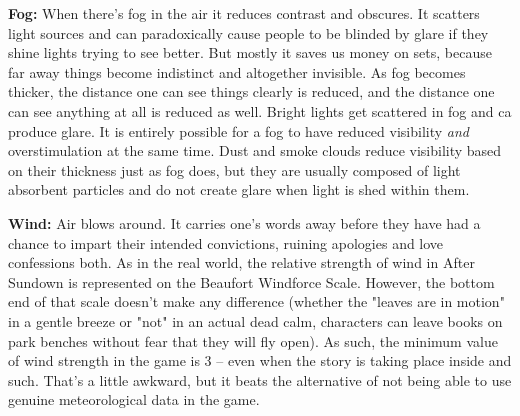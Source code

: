 \textbf{Fog:} When there's fog in the air it reduces contrast and obscures. It scatters light sources and can paradoxically cause people to be blinded by glare if they shine lights trying to see better. But mostly it saves us money on sets, because far away things become indistinct and altogether invisible. As fog becomes thicker, the distance one can see things clearly is reduced, and the distance one can see anything at all is reduced as well. Bright lights get scattered in fog and ca produce glare. It is entirely possible for a fog to have reduced visibility \textit{and} overstimulation at the same time. Dust and smoke clouds reduce visibility based on their thickness just as fog does, but they are usually composed of light absorbent particles and do not create glare when light is shed within them.

\textbf{Wind:} Air blows around. It carries one's words away before they have had a chance to impart their intended convictions, ruining apologies and love confessions both. As in the real world, the relative strength of wind in After Sundown is represented on the Beaufort Windforce Scale. However, the bottom end of that scale doesn't make any difference (whether the "leaves are in motion" in a gentle breeze or "not" in an actual dead calm, characters can leave books on park benches without fear that they will fly open). As such, the minimum value of wind strength in the game is 3 -- even when the story is taking place inside and such. That's a little awkward, but it beats the alternative of not being able to use genuine meteorological data in the game.

